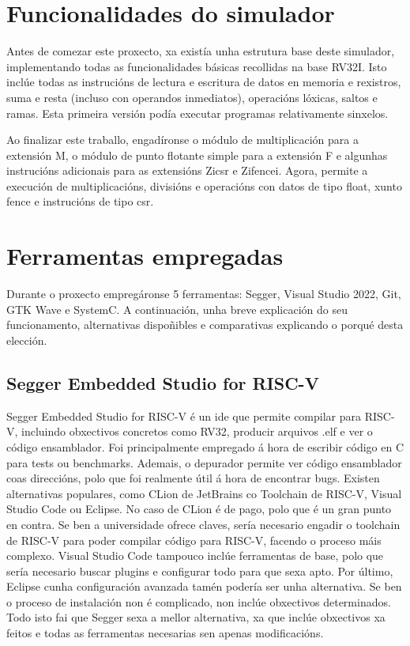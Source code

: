\section{Funcionalidades do simulador}\label{sec:func_sim}
Antes de comezar este proxecto, xa existía unha estrutura base deste simulador, implementando todas as funcionalidades básicas recollidas na base RV32I. Isto inclúe todas as instrucións de lectura e escritura de datos en memoria e rexistros, suma e resta (incluso con operandos inmediatos), operacións lóxicas, saltos e ramas. Esta primeira versión podía executar programas relativamente sinxelos.

Ao finalizar este traballo, engadíronse o módulo de multiplicación para a extensión M, o módulo de punto flotante simple para a extensión F e algunhas instrucións adicionais para as extensións Zicsr e Zifencei. Agora, permite a execución de multiplicacións, divisións e operacións con datos de tipo float, xunto fence e instrucións de tipo \acrshort{csr}.

\section{Ferramentas empregadas}\label{sec:ferramentas}
Durante o proxecto empregáronse 5 ferramentas: Segger, Visual Studio 2022, Git, GTK Wave e SystemC. A continuación, unha breve explicación do seu funcionamento, alternativas dispoñibles e comparativas explicando o porqué desta elección.

\subsection{Segger Embedded Studio for RISC-V}\label{sec:segger}
Segger Embedded Studio for RISC-V é un \acrfull{ide} que permite compilar para RISC-V, incluindo obxectivos concretos como RV32, producir arquivos .elf e ver o código ensamblador. Foi principalmente empregado á hora de escribir código en C para \gls{tests} ou \gls{benchmarks}. Ademais, o depurador permite ver código ensamblador coas direccións, polo que foi realmente útil á hora de encontrar bugs. Existen alternativas populares, como CLion de JetBrains co Toolchain de RISC-V, Visual Studio Code ou Eclipse. No caso de CLion é de pago, polo que é un gran punto en contra. Se ben a universidade ofrece claves, sería necesario engadir o toolchain de RISC-V para poder compilar código para RISC-V, facendo o proceso máis complexo. Visual Studio Code tampouco inclúe ferramentas de base, polo que sería necesario buscar plugins e configurar todo para que sexa apto. Por último, Eclipse cunha configuración avanzada tamén podería ser unha alternativa. Se ben o proceso de instalación non é complicado, non inclúe obxectivos determinados. Todo isto fai que Segger sexa a mellor alternativa, xa que inclúe obxectivos xa feitos e todas as ferramentas necesarias sen apenas modificacións.

